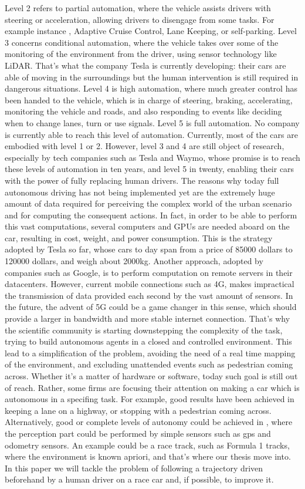 Level 2 refers to partial automation, where the vehicle assists drivers with steering or acceleration, allowing drivers to disengage from some tasks.  For example instance , Adaptive Cruise Control, Lane Keeping, or self-parking.
Level 3 concerns conditional automation, where the vehicle takes over some of the monitoring of the environment from the driver, using sensor technology like LiDAR. That's what the company Tesla is currently developing: their cars are able of moving in the surroundings but the human intervention is still required in dangerous situations.
Level 4 is high automation, where much greater control has been handed to the vehicle, which is in charge of steering, braking, accelerating, monitoring the vehicle and roads, and also responding to events like deciding when to change lanes, turn or use signals.
Level 5 is full automation. No company is currently able to reach this level of automation.
Currently, most of the cars are embodied with level 1 or 2. However, level 3 and 4 are still object of research, especially by tech companies such as Tesla and Waymo, whose promise is to reach these levels of automation in ten years, and level 5 in twenty, enabling their cars with the power of fully replacing human drivers.
The reasons why today full autonomous driving has not being implemented yet are the extremely huge amount of data required for perceiving the complex world of the urban scenario and for computing the consequent actions. In fact, in order to be able to perform this vast computations, several computers and GPUs are needed aboard on the car, resulting in cost, weight, and power consumption. This is the strategy adopted by Tesla so far, whose cars to day span from a price of 85000 dollars to 120000 dollars, and weigh about 2000kg. 
Another approach, adopted by companies such as Google, is to perform computation on remote servers in their datacenters. However, current mobile connections such as 4G, makes impractical the transmission of data provided each second by the vast amount of sensors.
In the future, the advent of 5G could be a game changer in this sense, which should provide a larger in bandwidth and more stable internet connection.
That's why the scientific community is starting downstepping the complexity of the task, trying to build autonomous agents in a closed and controlled environment. This lead to a simplification of the problem, avoiding the need of a real time mapping of the environment, and excluding unattended events such as pedestrian coming across.
Whether it's a matter of hardware or software, today such goal is still out of reach. Rather, some firms are focusing their attention on making a car which is autonomous in a specifing task. For example, good results have been achieved in keeping a lane on a highway, or stopping with a pedestrian coming across. 
Alternatively, good or complete levels of autonomy could be achieved in , where the perception part could be performed by simple sensors such as gps and odometry sensors.
An example could be a race track, such as Formula 1 tracks, where the environment is known apriori, and that's where our thesis move into.
In this paper we will tackle the problem of following a trajectory driven beforehand by a human driver on a race car and, if possible, to improve it.

